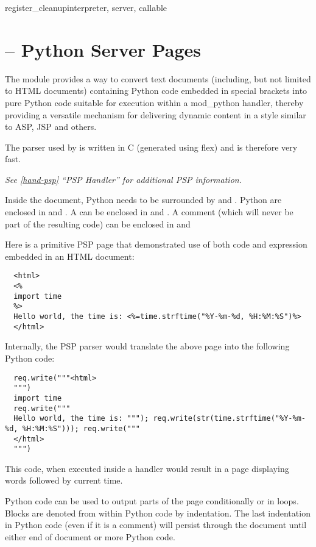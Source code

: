 \begin{funcdesc}{register_cleanup}{interpreter, server, callable}
\section{ -- Python Server Pages\label{pyapi-psp}}

The  module provides a way to convert text documents
(including, but not limited to HTML documents) containing Python code
embedded in special brackets into pure Python code suitable for
execution within a mod_python handler, thereby providing a versatile
mechanism for delivering dynamic content in a style similar to ASP,
JSP and others.

The parser used by  is written in C (generated using flex)
and is therefore very fast.

\emph{See \ref{hand-psp} ``PSP Handler'' for additional PSP
information.}

Inside the document, Python  needs to be surrounded by
\samp{<\%} and \samp{\%>}. Python  are enclosed in
\samp{<\%=} and \samp{\%>}. A  can be enclosed in
 and \samp{\%>}. A comment (which will never be part of
the resulting code) can be enclosed in \samp{<\%--} and \samp{--\%>}

Here is a primitive PSP page that demonstrated use of both code and
expression embedded in an HTML document:

\begin{verbatim}
  <html>
  <%
  import time
  %>
  Hello world, the time is: <%=time.strftime("%Y-%m-%d, %H:%M:%S")%>
  </html>
\end{verbatim}

Internally, the PSP parser would translate the above page into the
following Python code:

\begin{verbatim}
  req.write("""<html>
  """)
  import time
  req.write("""
  Hello world, the time is: """); req.write(str(time.strftime("%Y-%m-%d, %H:%M:%S"))); req.write("""
  </html>
  """)
\end{verbatim}

This code, when executed inside a handler would result in a page
displaying words  followed by current time.

Python code can be used to output parts of the page conditionally or
in loops. Blocks are denoted from within Python code by
indentation. The last indentation in Python code (even if it is a
comment) will persist through the document until either end of
document or more Python code.


\end{funcdesc}
